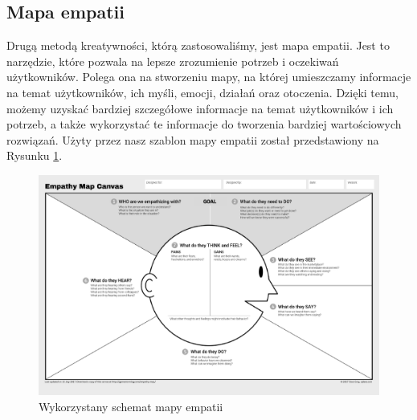 \subsection{Mapa empatii}
Drugą metodą kreatywności, którą zastosowaliśmy, jest mapa empatii. Jest to
narzędzie, które pozwala na lepsze zrozumienie potrzeb i oczekiwań użytkowników.
Polega ona na stworzeniu mapy, na której umieszczamy informacje na temat
użytkowników, ich myśli, emocji, działań oraz otoczenia. Dzięki temu, możemy
uzyskać bardziej szczegółowe informacje na temat użytkowników i ich potrzeb, a
także wykorzystać te informacje do tworzenia bardziej wartościowych rozwiązań.
Użyty przez nasz szablon mapy empatii został przedstawiony na Rysunku
\ref{mapa_empatii}.
\begin{figure}[h]
    \centering
    \includegraphics[width=\textwidth]{img/empathymap.png}
    \caption{Wykorzystany schemat mapy empatii}
    \label{mapa_empatii}
\end{figure}

